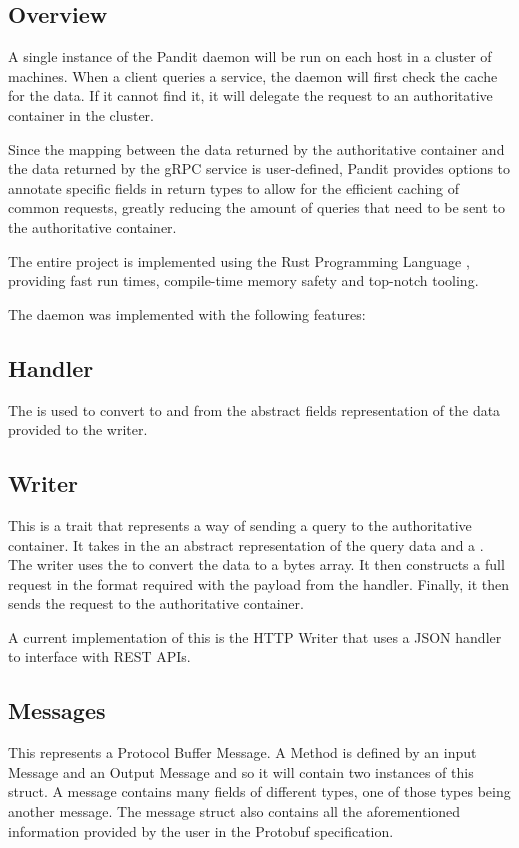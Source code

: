 \documentclass[a4paper]{article}
\begin{document}
\subsection{Overview}
A single instance of the Pandit daemon will be run on each host in a cluster of machines. When a client queries
a service, the daemon will first check the cache for the data. If it cannot find it, it will delegate the request
to an authoritative container in the cluster.

Since the mapping between the data returned by the authoritative container and the data returned by the gRPC service is
user-defined, Pandit provides options to annotate specific fields in return types to allow for the efficient caching of
common requests, greatly reducing the amount of queries that need to be sent to the authoritative container.

The entire project is implemented using the Rust Programming Language \cite{rust}, providing fast run times, compile-time memory safety
and top-notch tooling.

The daemon was implemented with the following features:

\subsection{Handler}
\label{sec:handler}
The \textit{} is used to convert to and from the abstract fields representation of the data provided to the writer.

\subsection{Writer}
\label{sec:writer}
This is a trait \cite{trait} that represents a way of sending a query to the authoritative container.
It takes in the an abstract representation of the query data and a \textit{}.
The writer uses the \textit{} to convert the data to a bytes array.
It then constructs a full request in the format required with the payload from the handler.
Finally, it then sends the request to the authoritative container.

A current implementation of this is the HTTP Writer that uses a JSON handler to interface with REST APIs.

\subsection{Messages}
\label{sec:messages}
This represents a Protocol Buffer Message. A Method is defined by an input Message and an Output Message and so it will contain two instances of this struct.
A message contains many fields of different types, one of those types being another message. The message struct also contains all the
aforementioned information provided by the user in the Protobuf specification.
\end{document}
